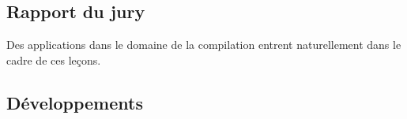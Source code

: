 \documentclass[../../agregation.tex]{subfiles}
\begin{document}

\subsection{Rapport du jury}

\begin{aquote}{}
Des applications dans le domaine de la compilation entrent naturellement dans le cadre de ces leçons.
\end{aquote}

\subsection{Développements}

\dvts
\end{document}
